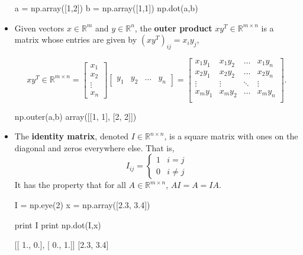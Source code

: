 \begin{itemize}
\begin{python}
a = np.array([1,2])
b = np.array([1,1])
np.dot(a,b)
\end{python}

\item Given vectors $x \in \mathbb{R}^{m}$ and $y \in \mathbb{R}^{n}$, the {\bf outer product} $xy^{T} \in \mathbb{R}^{m\times n}$
is a matrix whose entries are given by $(xy^{T})_{ij}=x_{i}y_{j}$,


\begin{equation*}
xy^{T} \in \mathbb{R}^{m\times n} = \left[\begin{array}{c}
x_{1} \\ x_{2} \\ \vdots \\ x_{n}\end{array}\right] \left[\begin{array}{cccc}
y_{1} &
y_{2} &
\ldots &
y_{n}
\end{array}\right] =   \left[\begin{array}{cccc}
x_{1}y_{1} & x_{1}y_{2} & \ldots & x_{1}y_{n} \\
x_{2}y_{1} & x_{2}y_{2} & \ldots & x_{2}y_{n} \\
\vdots & \vdots & \ddots & \vdots \\
x_{m}y_{1} & x_{m}y_{2} & \ldots & x_{m}y_{n} \\
\end{array}\right].
\end{equation*}

\begin{python}
np.outer(a,b)
array([[1, 1],
       [2, 2]])
\end{python}


\item The {\bf identity matrix}, denoted $I\in \mathbb{R}^{n\times n}$, is a square matrix with ones on the diagonal and zeros 
everywhere else. That is,
\begin{equation*}
I_{ij}=\left\{\begin{array}{cc}
1 & i=j \\
0 & i\neq j
\end{array}\right.
\end{equation*}
It has the property that for all $A \in \mathbb{R}^{m \times n}$, $AI = A = IA.$

\begin{python}
I = np.eye(2)
x = np.array([2.3, 3.4])

print I
print np.dot(I,x)

[[ 1.,  0.],
 [ 0.,  1.]]
[2.3, 3.4]
\end{python}


\end{itemize}
